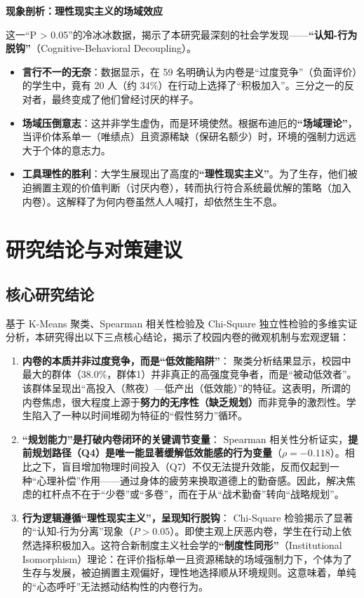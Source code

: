 \documentclass[win,thesis]{hustreport} %
\begin{document}
\textbf{现象剖析：理性现实主义的场域效应}

这一“P > 0.05”的冷冰冰数据，揭示了本研究最深刻的社会学发现——\textbf{“认知-行为脱钩”}（Cognitive-Behavioral Decoupling）。

\begin{itemize}
	\item \textbf{言行不一的无奈}：数据显示，在 59 名明确认为内卷是“过度竞争”（负面评价）的学生中，竟有 20 人（约 34\%）在行动上选择了“积极加入”。三分之一的反对者，最终变成了他们曾经讨厌的样子。
	\item \textbf{场域压倒意志}：这并非学生虚伪，而是环境使然。根据布迪厄的\textbf{“场域理论”}，当评价体系单一（唯绩点）且资源稀缺（保研名额少）时，环境的强制力远远大于个体的意志力。
	\item \textbf{工具理性的胜利}：大学生展现出了高度的\textbf{“理性现实主义”}。为了生存，他们被迫搁置主观的价值判断（讨厌内卷），转而执行符合系统最优解的策略（加入内卷）。这解释了为何内卷虽然人人喊打，却依然生生不息。
\end{itemize}

\newpage
\section{研究结论与对策建议}

\subsection{核心研究结论}
基于 K-Means 聚类、Spearman 相关性检验及 Chi-Square 独立性检验的多维实证分析，本研究得出以下三点核心结论，揭示了校园内卷的微观机制与宏观逻辑：

\begin{enumerate}
	\item \textbf{内卷的本质并非过度竞争，而是“低效能陷阱”}：
	聚类分析结果显示，校园中最大的群体（38.0\%，群体1）并非真正的高强度竞争者，而是“被动低效者”。该群体呈现出“高投入（熬夜）—低产出（低效能）”的特征。这表明，所谓的内卷焦虑，很大程度上源于\textbf{努力的无序性（缺乏规划）}而非竞争的激烈性。学生陷入了一种以时间堆砌为特征的“假性努力”循环。
	
	\item \textbf{“规划能力”是打破内卷闭环的关键调节变量}：
	Spearman 相关性分析证实，\textbf{提前规划路径（Q4）是唯一能显著缓解低效能感的行为变量}（$\rho = -0.118$）。相比之下，盲目增加物理时间投入（Q7）不仅无法提升效能，反而仅起到一种“心理补偿”作用——通过身体的疲劳来换取道德上的勤奋感。因此，解决焦虑的杠杆点不在于“少卷”或“多卷”，而在于从“战术勤奋”转向“战略规划”。
	
	\item \textbf{行为逻辑遵循“理性现实主义”，呈现知行脱钩}：
	Chi-Square 检验揭示了显著的“认知-行为分离”现象（$P > 0.05$）。即使主观上厌恶内卷，学生在行动上依然选择积极加入。这符合新制度主义社会学的\textbf{“制度性同形”}（Institutional Isomorphism）理论：在评价指标单一且资源稀缺的场域强制力下，个体为了生存与发展，被迫搁置主观偏好，理性地选择顺从环境规则。这意味着，单纯的“心态呼吁”无法撼动结构性的内卷行为。
\end{enumerate}
\end{document}
